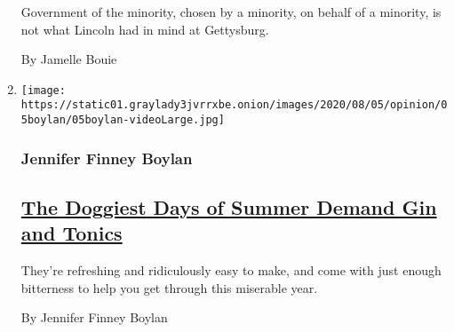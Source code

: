 \begin{enumerate}
  Government of the minority, chosen by a minority, on behalf of a
  minority, is not what Lincoln had in mind at Gettysburg.

  By Jamelle Bouie
\item
  \texttt{[image: https://static01.graylady3jvrrxbe.onion/images/2020/08/05/opinion/05boylan/05boylan-videoLarge.jpg]}

  \hypertarget{jennifer-finney-boylan}{%
  \subsubsection{Jennifer Finney Boylan}\label{jennifer-finney-boylan}}

  \hypertarget{the-doggiest-days-of-summer-demand-gin-and-tonics}{%
  \subsection{\texorpdfstring{\href{/2020/08/04/opinion/gin-tonic-summer-drink.html}{The
  Doggiest Days of Summer Demand Gin and
  Tonics}}{The Doggiest Days of Summer Demand Gin and Tonics}}\label{the-doggiest-days-of-summer-demand-gin-and-tonics}}

  They're refreshing and ridiculously easy to make, and come with just
  enough bitterness to help you get through this miserable year.

  By Jennifer Finney Boylan
\end{enumerate}

